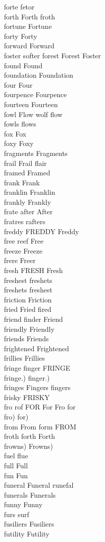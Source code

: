 forte fetor\\
forth Forth froth\\
fortune Fortune\\
forty Forty\\
forward Forward\\
foster softer forest Forest Foster\\
found Found\\
foundation Foundation\\
four Four\\
fourpence Fourpence\\
fourteen Fourteen\\
fowl Flow wolf flow\\
fowls flows\\
fox Fox\\
foxy Foxy\\
fragments Fragments\\
frail Frail flair\\
framed Framed\\
frank Frank\\
franklin Franklin\\
frankly Frankly\\
frate after After\\
fratres rafters\\
freddy FREDDY Freddy\\
free reef Free\\
freeze Freeze\\
frere Freer\\
fresh FRESH Fresh\\
freshest freshets\\
freshets freshest\\
friction Friction\\
fried Fried fired\\
friend finder Friend\\
friendly Friendly\\
friends Friends\\
frightened Frightened\\
frillies Frillies\\
fringe finger FRINGE\\
fringe.) finger.)\\
fringes Fingers fingers\\
frisky FRISKY\\
fro rof FOR For Fro for\\
fro) for)\\
from From form FROM\\
froth forth Forth\\
frowns) Frowns)\\
fuel flue\\
full Full\\
fun Fun\\
funeral Funeral runefal\\
funerals Funerals\\
funny Funny\\
furs surf\\
fusiliers Fusiliers\\
futility Futility\\

